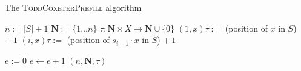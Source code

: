\begin{algorithm}
\caption{The \textsc{ToddCoxeterPrefill} algorithm}
\label{alg:tc-prefill}
\begin{algorithmic}[1]
\State $n := |S| + 1$
\State $\mathbf{N} := \{1 \ldots n\}$
\State $\tau : \mathbf{N} \times X \to \mathbf{N} \cup \{0\}$
  \State $(1, x)\tau :=$ (position of $x$ in $S$) $+~1$
    \State $(i, x)\tau :=$ (position of $s_{i-1} \cdot x$ in $S$) $+~1$
  \EndFor
\EndFor

\State $e := 0$
\Repeat
  \State $e \gets e + 1$
      \State {}
    \EndFor
  \EndIf
{}  
\State \Return $(n, \mathbf{N}, \tau)$

\EndProcedure
\end{algorithmic}
\end{algorithm}

